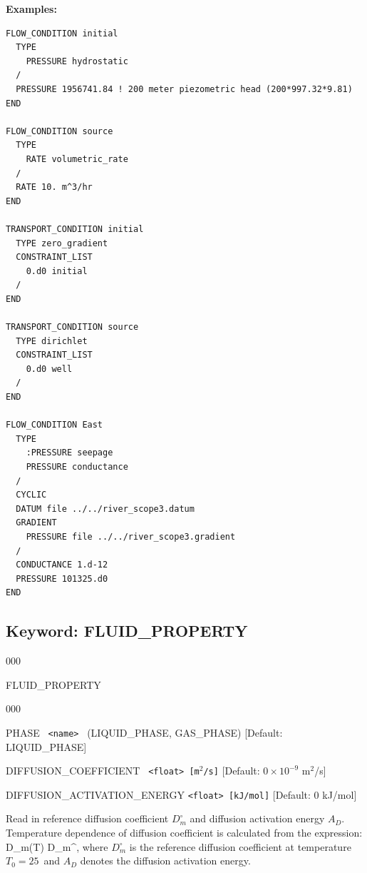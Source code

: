 \documentclass[12pt]{article}
\begin{document}
\bigskip

\begin{mdframed}

{\noindent\bf Examples:}
\begin{verbatim}
FLOW_CONDITION initial
  TYPE
    PRESSURE hydrostatic
  /
  PRESSURE 1956741.84 ! 200 meter piezometric head (200*997.32*9.81)
END

FLOW_CONDITION source
  TYPE
    RATE volumetric_rate
  /
  RATE 10. m^3/hr
END

TRANSPORT_CONDITION initial
  TYPE zero_gradient
  CONSTRAINT_LIST
    0.d0 initial
  /
END

TRANSPORT_CONDITION source
  TYPE dirichlet
  CONSTRAINT_LIST
    0.d0 well
  /
END

FLOW_CONDITION East
  TYPE
    :PRESSURE seepage
    PRESSURE conductance
  /
  CYCLIC
  DATUM file ../../river_scope3.datum
  GRADIENT
    PRESSURE file ../../river_scope3.gradient
  /
  CONDUCTANCE 1.d-12
  PRESSURE 101325.d0
END
\end{verbatim}
\end{mdframed}

\hyperlink{target_key}{\return}


\newpage
\protect\hypertarget{target_fluid_property}{}

\subsection{Keyword: FLUID\_PROPERTY}


\begin{deflist}{000}
\item[FLUID\_PROPERTY]~
\begin{deflist}{000}
\item[PHASE] \ {\tt <name>} \ (LIQUID\_PHASE, GAS\_PHASE) [Default: LIQUID\_PHASE]
\item[DIFFUSION\_COEFFICIENT] \ {\tt <float> [m$^2$/s]} [Default: $0\times 10^{-9}$ m$^2$/s]
\item[DIFFUSION\_ACTIVATION\_ENERGY] {\tt <float> [kJ/mol]} [Default: 0 kJ/mol]
\end{deflist}
\item[\keyend]
\end{deflist}

 Read in reference diffusion coefficient $D_m^\circ$ and diffusion activation energy $A_D$. Temperature dependence of diffusion coefficient is calculated from the expression:
\EQ
D_m(T) \eq D_m^\circ\exp{},
\EN
where $D_m^\circ$ is the reference diffusion coefficient at temperature $T_0 = 25$\degc\ and $A_D$ denotes the diffusion activation energy.
\end{document}
